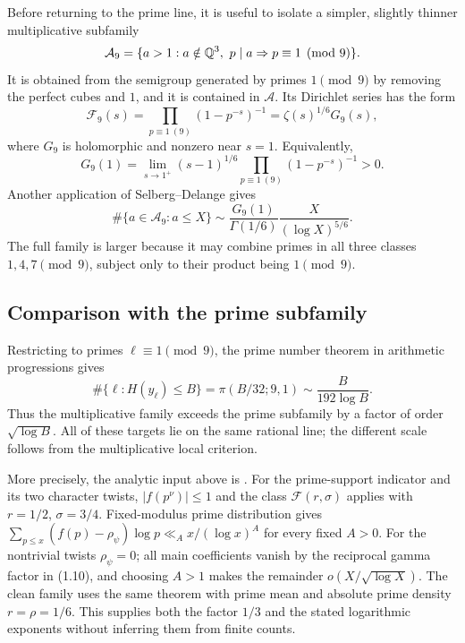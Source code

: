 Before returning to the prime line, it is useful to isolate a simpler,
slightly thinner multiplicative subfamily
\begin{equation}
 \mathcal A_9=
 \{a>1:a\notin\mathbb Q^3,\ p\mid a\Rightarrow p\equiv1\pmod9\}.
\end{equation}
It is obtained from the semigroup generated by primes \(1\pmod9\) by
removing the perfect cubes and \(1\), and it is contained in
\(\mathcal A\).  Its Dirichlet
series has the form
\begin{equation}
 \mathcal F_9(s)
 =\prod_{p\equiv1\ (9)}(1-p^{-s})^{-1}
 =\zeta(s)^{1/6}G_9(s),
\end{equation}
where \(G_9\) is holomorphic and nonzero near \(s=1\).  Equivalently,
\begin{equation}
 G_9(1)=
 \lim_{s\to1^+}(s-1)^{1/6}
 \prod_{p\equiv1\ (9)}(1-p^{-s})^{-1}>0.
\end{equation}
Another application of Selberg--Delange gives
\begin{equation}
 \#\{a\in\mathcal A_9:a\le X\}
 \sim
 \frac{G_9(1)}{\Gamma(1/6)}
 \frac{X}{(\log X)^{5/6}}.
\end{equation}
The full family is larger because it may combine primes in all three
classes \(1,4,7\pmod9\), subject only to their product being \(1\pmod9\).

\subsection{Comparison with the prime subfamily}

Restricting to primes \(\ell\equiv1\pmod9\), the prime number theorem in
arithmetic progressions gives
\begin{equation}
 \#\{\ell:H(y_\ell)\le B\}
 =\pi(B/32;9,1)
 \sim\frac{B}{192\log B}.
\end{equation}
Thus the multiplicative family exceeds the prime subfamily by a factor
of order \(\sqrt{\log B}\). All of these targets lie on the same rational
line; the different scale follows from the multiplicative local criterion.

More precisely, the analytic input above is
\cite[Theorem~1.2, equations~(1.10)--(1.12)]{BretecheTenenbaum}.
For the prime-support indicator and its two character twists,
$|f(p^\nu)|\le1$ and the class $\mathcal F(r,\sigma)$ applies with
$r=1/2$, $\sigma=3/4$. Fixed-modulus prime distribution gives
$\sum_{p\le x}(f(p)-\rho_\psi)\log p\ll_A x/(\log x)^A$
for every fixed $A>0$. For the nontrivial twists $\rho_\psi=0$;
all main coefficients vanish by the reciprocal gamma factor in (1.10),
and choosing $A>1$ makes the remainder $o(X/\sqrt{\log X})$.
The clean family uses the same theorem with prime mean and absolute
prime density $r=\rho=1/6$. This supplies both the factor $1/3$ and
the stated logarithmic exponents without inferring them from finite counts.
